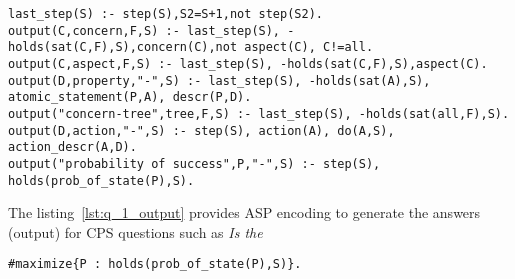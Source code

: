 %
\begin{lstlisting}[language=clingo,caption=Output of Query 1, label=lst:q_1_output, mathescape=true,xleftmargin=.01\textwidth, breaklines=true]
last_step(S) :- step(S),S2=S+1,not step(S2).
output(C,concern,F,S) :- last_step(S), -holds(sat(C,F),S),concern(C),not aspect(C), C!=all.
output(C,aspect,F,S) :- last_step(S), -holds(sat(C,F),S),aspect(C).
output(D,property,"-",S) :- last_step(S), -holds(sat(A),S), atomic_statement(P,A), descr(P,D).
output("concern-tree",tree,F,S) :- last_step(S), -holds(sat(all,F),S).
output(D,action,"-",S) :- step(S), action(A), do(A,S), action_descr(A,D).
output("probability of success",P,"-",S) :- step(S), holds(prob_of_state(P),S).
\end{lstlisting}
%
The listing~\ref{lst:q_1_output} provides ASP encoding to generate the answers (output) for CPS questions such as \emph{Is the }
%
\begin{lstlisting}[language=clingo,caption=Optimization to select the best mitigation strategy, label=lst:q_1_optimization, mathescape=true,xleftmargin=.01\textwidth, breaklines=true]
#maximize{P : holds(prob_of_state(P),S)}.
\end{lstlisting}
%
